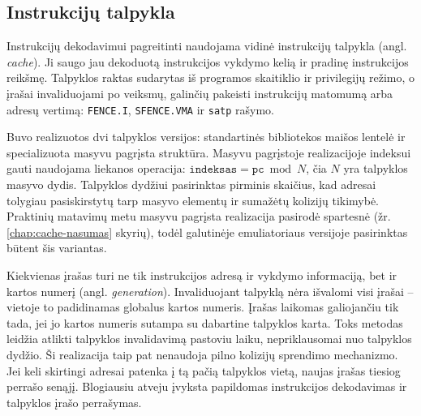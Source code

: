 \subsection{Instrukcijų talpykla}
\label{chap:instrukciju-cache-realizacija}

Instrukcijų dekodavimui pagreitinti naudojama vidinė instrukcijų talpykla (angl. \textit{cache}). Ji saugo jau dekoduotą instrukcijos vykdymo kelią ir pradinę instrukcijos reikšmę. Talpyklos raktas sudarytas iš programos skaitiklio ir privilegijų režimo, o įrašai invaliduojami po veiksmų, galinčių pakeisti instrukcijų matomumą arba adresų vertimą: \texttt{FENCE.I}, \texttt{SFENCE.VMA} ir \texttt{satp} rašymo.

Buvo realizuotos dvi talpyklos versijos: standartinės bibliotekos maišos lentelė ir specializuota masyvu pagrįsta struktūra. Masyvu pagrįstoje realizacijoje indeksui gauti naudojama liekanos operacija: $\texttt{indeksas} = \texttt{pc} \bmod N$, čia $N$ yra talpyklos masyvo dydis. Talpyklos dydžiui pasirinktas pirminis skaičius, kad adresai tolygiau pasiskirstytų tarp masyvo elementų ir sumažėtų kolizijų tikimybė. Praktinių matavimų metu masyvu pagrįsta realizacija pasirodė spartesnė (žr. \ref{chap:cache-nasumas} skyrių), todėl galutinėje emuliatoriaus versijoje pasirinktas būtent šis variantas.

Kiekvienas įrašas turi ne tik instrukcijos adresą ir vykdymo informaciją, bet ir kartos numerį (angl. \textit{generation}). Invaliduojant talpyklą nėra išvalomi visi įrašai -- vietoje to padidinamas globalus kartos numeris. Įrašas laikomas galiojančiu tik tada, jei jo kartos numeris sutampa su dabartine talpyklos karta. Toks metodas leidžia atlikti talpyklos invalidavimą pastoviu laiku, nepriklausomai nuo talpyklos dydžio. Ši realizacija taip pat nenaudoja pilno kolizijų sprendimo mechanizmo. Jei keli skirtingi adresai patenka į tą pačią talpyklos vietą, naujas įrašas tiesiog perrašo senąjį. Blogiausiu atveju įvyksta papildomas instrukcijos dekodavimas ir talpyklos įrašo perrašymas.

